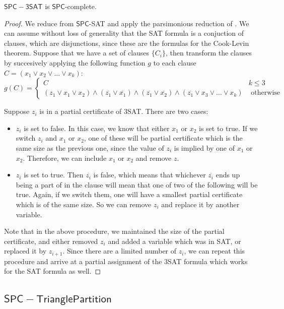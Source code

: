 \documentclass[runningheads,a4paper]{llncs}
\begin{document}
\begin{theorem}
$\mathsf{SPC-3SAT}$ is $\mathsf{SPC}$-complete.
\end{theorem}

\begin{proof}
We reduce from $\mathsf{SPC}$-SAT and apply the parsimonious reduction of \cite{yaleclass}. We can assume without loss of generality that the SAT formula is a conjuction of clauses, which are disjunctions, since these are the formulas for the Cook-Levin theorem. Suppose that we have a set of clauses $\{ C_i \}$, then transform the clauses by succesively applying the following function $g$ to each clause $C = (x_1 \vee x_2 \vee ... \vee x_k)$:
\[ g(C) = \left\{ \begin{array}{cc} C & k \leq 3 \\
						    (z_1 \vee x_1 \vee x_2) \wedge (\overline{z_1} \vee \overline{x_1}) \wedge (\overline{z_1} \vee \overline{x_2}) \wedge (\overline{z_1} \vee x_3 \vee ... \vee x_k) & \text{ otherwise }\end{array} \right. \] 

Suppose $z_i$ is in a partial certificate of 3SAT. There are two cases:
\begin{itemize}
\item $z_i$ is set to false. In this case, we know that either $x_1$ or $x_2$ is set to true. If we switch $z_i$ and $x_1$ or $x_2$, one of these will be partial certificate which is the same size as the previous one, since the value of $z_i$ is implied by one of $x_1$ or $x_2$. Therefore, we can include $x_1$ or $x_2$ and remove $z$.
\item $z_i$ is set to true. Then $\overline{z_i}$ is false, which means that whichever $\overline{z_i}$ ends up being a part of in the clause will mean that one of two of the following will be true. Again, if we switch them, one will have a smallest partial certificate which is of the same size. So we can remove $z_i$ and replace it by another variable. 
\end{itemize}
Note that in the above procedure, we maintained the size of the partial certificate, and either removed $z_i$ and added a variable which was in SAT, or replaced it by $z_{i+1}$. Since there are a limited number of $z_i$, we can repeat this procedure and arrive at a partial assignment of the 3SAT formula which works for the SAT formula as well.
\end{proof}

\subsection{$\mathsf{SPC-Triangle Partition}$}
\end{document}
